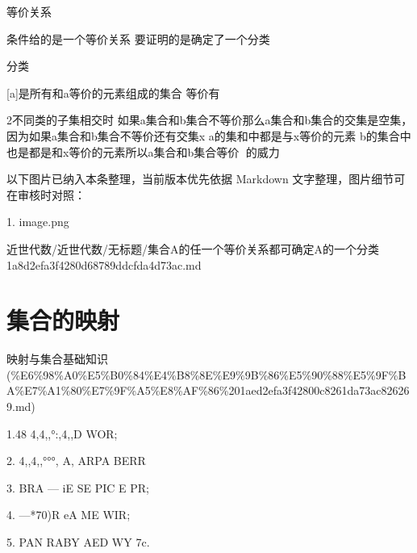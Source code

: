 \begin{note}[集合A的任一个等价关系都可确定A的一个分类]

等价关系

条件给的是一个等价关系 要证明的是确定了一个分类

分类

[a]是所有和a等价的元素组成的集合 等价有

2不同类的子集相交时 如果a集合和b集合不等价那么a集合和b集合的交集是空集，因为如果a集合和b集合不等价还有交集x a的集和中都是与x等价的元素  b的集合中也是都是和x等价的元素所以a集合和b集合等价   🟰的威力

\end{note}

\begin{note}[关联图片]
以下图片已纳入本条整理，当前版本优先依据 Markdown 文字整理，图片细节可在审核时对照：

1. image.png\\

\end{note}

\begin{note}[来源路径]

近世代数/近世代数/无标题/集合A的任一个等价关系都可确定A的一个分类 1a8d2efa3f4280d68789ddcfda4d73ac.md

\end{note}

\section*{集合的映射}

\begin{note}[来源上级主题]

映射与集合基础知识 (\%E6\%98\%A0\%E5\%B0\%84\%E4\%B8\%8E\%E9\%9B\%86\%E5\%90\%88\%E5\%9F\%BA\%E7\%A1\%80\%E7\%9F\%A5\%E8\%AF\%86\%201aed2efa3f42800c8261da73ac826269.md)

\end{note}

\begin{note}[集合的映射]

1.48 4,4,,°:,4,,D WOR;

2. 4,,4,,°°°, A, ARPA BERR

3. BRA — iE SE PIC E PR;

4. —*70)R eA ME WIR;

5. PAN RABY AED WY 7c.

\end{note}

